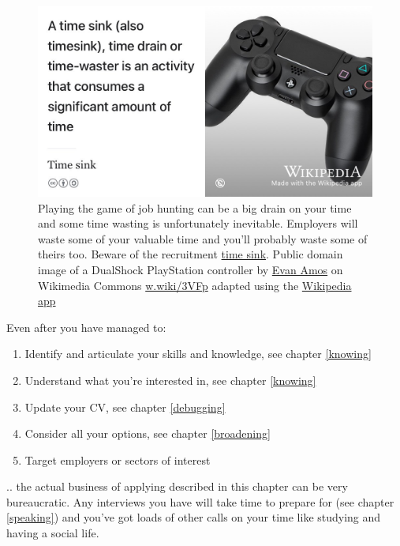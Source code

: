 \documentclass[
]{book}
\providecommand{\tightlist}{%
  \setlength{\itemsep}{0pt}\setlength{\parskip}{0pt}}
\begin{document}
\begin{figure}

{\centering \includegraphics[width=0.98\linewidth]{images/timesink} 

}

\caption{Playing the game of job hunting can be a big drain on your time and some time wasting is unfortunately inevitable. Employers will waste some of your valuable time and you'll probably waste some of theirs too. Beware of the recruitment \href{https://en.wikipedia.org/wiki/Time_sink}{time sink}. Public domain image of a DualShock PlayStation controller by \href{https://en.wikipedia.org/wiki/Evan_Amos}{Evan Amos} on Wikimedia Commons \href{https://w.wiki/3VFp}{w.wiki/3VFp} adapted using the \href{https://apps.apple.com/gb/app/wikipedia/id324715238}{Wikipedia app}}\label{fig:timesink-fig}
\end{figure}



Even after you have managed to:

\begin{enumerate}
\def\labelenumi{\arabic{enumi}.}
\tightlist
\item
  Identify and articulate your skills and knowledge, see chapter \ref{knowing}
\item
  Understand what you're interested in, see chapter \ref{knowing}
\item
  Update your CV, see chapter \ref{debugging}
\item
  Consider all your options, see chapter \ref{broadening}
\item
  Target employers or sectors of interest
\end{enumerate}

.. the actual business of applying described in this chapter can be very bureaucratic. Any interviews you have will take time to prepare for (see chapter \ref{speaking}) and you've got loads of other calls on your time like studying and having a social life.
\end{document}
